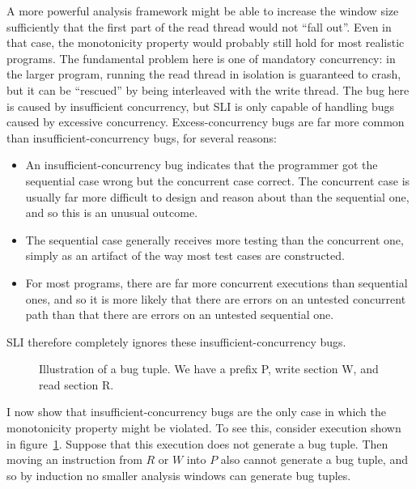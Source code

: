 
A more powerful analysis framework might be able to increase the
window size sufficiently that the first part of the read thread would
not ``fall out''.  Even in that case, the monotonicity property would
probably still hold for most realistic programs.  The fundamental
problem here is one of mandatory concurrency: in the larger program,
running the read thread in isolation is guaranteed to crash, but it
can be ``rescued'' by being interleaved with the write thread.  The
bug here is caused by insufficient concurrency, but SLI is only
capable of handling bugs caused by excessive concurrency.
Excess-concurrency bugs are far more common than
insufficient-concurrency bugs, for several reasons:

\begin{itemize}
\item
  An insufficient-concurrency bug indicates that the programmer got
  the sequential case wrong but the concurrent case correct.  The
  concurrent case is usually far more difficult to design and reason
  about than the sequential one, and so this is an unusual
  outcome\needCite{}.
\item
  The sequential case generally receives more testing than the
  concurrent one, simply as an artifact of the way most test cases are
  constructed\needCite{}.
\item
  For most programs, there are far more concurrent executions than
  sequential ones, and so it is more likely that there are errors on
  an untested concurrent path than that there are errors on an
  untested sequential one.
\end{itemize}

SLI therefore completely ignores these insufficient-concurrency bugs.


\begin{figure}
Illustration of a bug tuple.  We have a prefix P, write section W, and read section R.
\label{fig:mandatory_concurrency3}
\end{figure}

I now show that insufficient-concurrency bugs are the only case in
which the monotonicity property might be violated.  To see this,
consider execution shown in figure~\ref{fig:mandatory_concurrency3}.
Suppose that this execution does not generate a bug tuple.  Then
moving an instruction from $R$ or $W$ into $P$ also cannot generate a
bug tuple, and so by induction no smaller analysis windows can
generate bug tuples.

